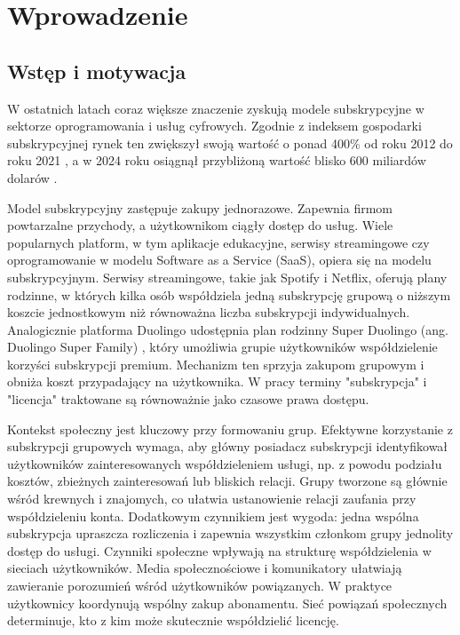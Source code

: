 \chapter{Wprowadzenie}\label{chap:introduction}
\section{Wstęp i motywacja}
W ostatnich latach coraz większe znaczenie zyskują modele subskrypcyjne w sektorze oprogramowania i usług cyfrowych. Zgodnie z indeksem gospodarki subskrypcyjnej rynek ten zwiększył swoją wartość o ponad 400\% od roku 2012 do roku 2021 \cite{subscriptionEconomyIndex}, a w 2024 roku osiągnął przybliżoną wartość blisko 600 miliardów dolarów \cite{subscriptionEconomyPrice2024}. 

Model subskrypcyjny zastępuje zakupy jednorazowe. Zapewnia firmom powtarzalne przychody, a użytkownikom ciągły dostęp do usług. Wiele popularnych platform, w tym aplikacje edukacyjne, serwisy streamingowe czy oprogramowanie w modelu Software as a Service (SaaS), opiera się na modelu subskrypcyjnym. Serwisy streamingowe, takie jak Spotify i Netflix, oferują plany rodzinne, w których kilka osób współdziela jedną subskrypcję grupową o niższym koszcie jednostkowym niż równoważna liczba subskrypcji indywidualnych. Analogicznie platforma Duolingo udostępnia plan rodzinny Super Duolingo (ang. Duolingo Super Family) \cite{duolingo_family}, który umożliwia grupie użytkowników współdzielenie korzyści subskrypcji premium. Mechanizm ten sprzyja zakupom grupowym i obniża koszt przypadający na użytkownika. W pracy terminy "subskrypcja" i "licencja" traktowane są równoważnie jako czasowe prawa dostępu.

Kontekst społeczny jest kluczowy przy formowaniu grup. Efektywne korzystanie z subskrypcji grupowych wymaga, aby główny posiadacz subskrypcji identyfikował użytkowników zainteresowanych współdzieleniem usługi, np. z powodu podziału kosztów, zbieżnych zainteresowań lub bliskich relacji. Grupy tworzone są głównie wśród krewnych i znajomych, co ułatwia ustanowienie relacji zaufania przy współdzieleniu konta. Dodatkowym czynnikiem jest wygoda: jedna wspólna subskrypcja upraszcza rozliczenia i zapewnia wszystkim członkom grupy jednolity dostęp do usługi. Czynniki społeczne wpływają na strukturę współdzielenia w sieciach użytkowników. Media społecznościowe i komunikatory ułatwiają zawieranie porozumień wśród użytkowników powiązanych. W praktyce użytkownicy koordynują wspólny zakup abonamentu. Sieć powiązań społecznych determinuje, kto z kim może skutecznie współdzielić licencję.

